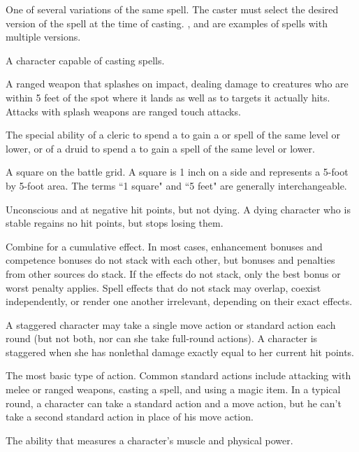  One of several variations of the same spell. The 
caster must select the desired version of the spell at the time of 
casting.  ,   and   are examples of 
spells with multiple versions. 

 A character capable of casting spells. 

 A ranged 
weapon that splashes on impact, 
dealing damage to creatures who are 
within 5 feet of the spot where it lands as well as to targets it actually 
hits. Attacks with splash weapons are ranged touch attacks. 

 The special ability of a cleric to spend a 
 to gain a  or  spell of 
the same level or lower, or of a druid to spend a  to gain 
a  spell of the same level or lower.

 A square on the battle grid. A square is 1 inch on a side 
and represents a 5-foot by 5-foot area. The terms ``1 square" and ``5 
feet" are generally interchangeable. 

 Unconscious and at negative hit points, but not dying. A dying character who is stable regains no hit points, but stops losing them.

 Combine for a cumulative effect. In most cases, enhancement bonuses and competence bonuses do not stack with each other, but bonuses and penalties from other sources do stack. If the effects do not stack, only the best bonus or worst penalty 
applies. Spell effects that do 
not stack may overlap, coexist independently, or render one another 
irrelevant, depending on their exact effects. 

 A staggered character may take a single move action or 
standard action each round (but not both, nor can she take full-round actions). A character is staggered when she has nonlethal damage exactly equal to her current hit points.

 The most basic type of action. Common 
standard actions include attacking with melee or ranged weapons, casting a 
spell, and using a magic item. In a typical round, a character can take 
a standard action and a move action, but he can't take a second 
standard action in place of his move action. 

 The ability that measures a character's muscle and 
physical power. 

